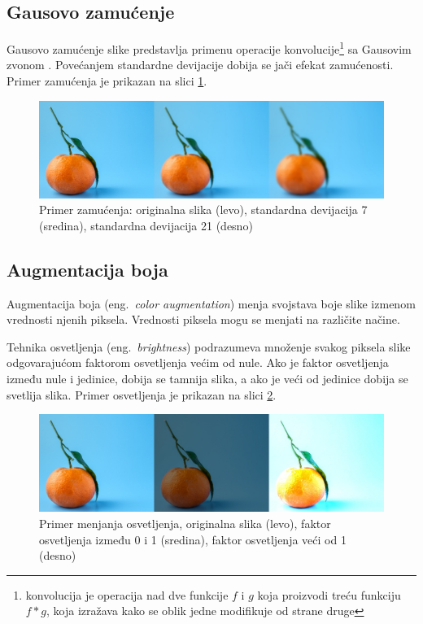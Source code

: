 \documentclass[12pt,oneside]{memoir}
\begin{document}
\subsection{Gausovo zamućenje}
Gausovo zamućenje slike predstavlja primenu operacije konvolucije\footnote{konvolucija je operacija nad dve funkcije \(f\) i \(g\) koja proizvodi treću funkciju \(f*g\), koja izražava kako se oblik jedne modifikuje od strane druge} sa Gausovim zvonom \cite{ni2019}.
Povećanjem standardne devijacije dobija se jači efekat zamućenosti. Primer zamućenja je prikazan na slici \ref{fig:section3_blur}.


\begin{figure}[ht]
    \centering
    \includegraphics[width=1\textwidth]{matfmaster/glava3/blur.jpg}
    \caption{Primer zamućenja: originalna slika (levo), standardna devijacija 7 (sredina), standardna devijacija 21 (desno) \cite{unsplashOrange}} 
    \label{fig:section3_blur}
\end{figure}


\subsection{Augmentacija boja}

Augmentacija boja (eng.~\textit{color augmentation}) menja svojstava boje slike izmenom vrednosti njenih piksela. Vrednosti piksela mogu se menjati na različite načine.

Tehnika osvetljenja (eng.~\textit{brightness}) podrazumeva množenje svakog piksela slike odgovarajućom faktorom osvetljenja većim od nule. Ako je faktor osvetljenja između nule i jedinice, dobija se tamnija slika, a ako je veći od jedinice dobija se svetlija slika. Primer osvetljenja je prikazan na slici \ref{fig:section3_brightness}.

\begin{figure}[ht]
    \centering
    \includegraphics[width=1\textwidth]{matfmaster/glava3/brightness.jpg}
    \caption{Primer menjanja osvetljenja, originalna slika (levo), faktor osvetljenja između 0 i 1 (sredina), faktor osvetljenja veći od 1 (desno) \cite{unsplashOrange}} 
    \label{fig:section3_brightness}
\end{figure}
\end{document}

